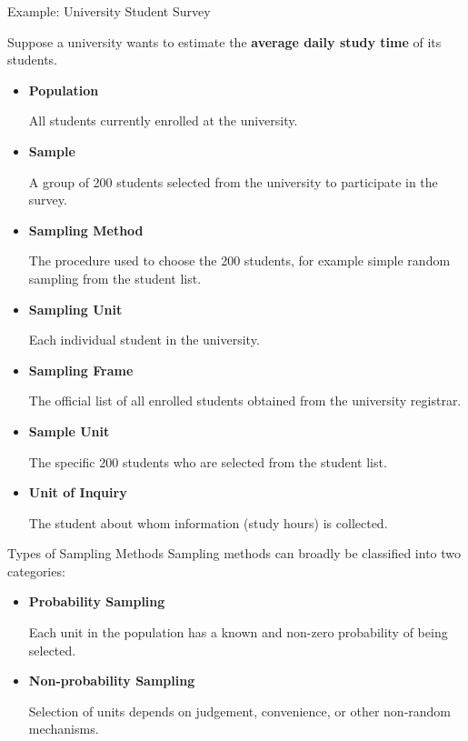 \documentclass[12pt, aspectratio=169]{beamer}
\begin{document}
    \begin{frame}[allowframebreaks]{Example: University Student Survey}

        Suppose a university wants to estimate the \textbf{average daily study time} of its students.

        \begin{itemize}
        \item \textbf{Population}

        All students currently enrolled at the university.

        \item \textbf{Sample}

        A group of 200 students selected from the university to participate in the survey.

        \item \textbf{Sampling Method}

        The procedure used to choose the 200 students, for example simple random sampling from the student list.

        \item \textbf{Sampling Unit}

        Each individual student in the university.

        \item \textbf{Sampling Frame}

        The official list of all enrolled students obtained from the university registrar.

        \item \textbf{Sample Unit}

        The specific 200 students who are selected from the student list.

        \item \textbf{Unit of Inquiry}

        The student about whom information (study hours) is collected.
        \end{itemize}

    \end{frame}


    \begin{frame}{Types of Sampling Methods}
        Sampling methods can broadly be classified into two categories:

        \begin{itemize}
            \item \textbf{Probability Sampling}

            Each unit in the population has a known and non-zero probability of being selected.

            \item \textbf{Non-probability Sampling}

            Selection of units depends on judgement, convenience, or other non-random mechanisms.
        \end{itemize}
    \end{frame}
\end{document}
